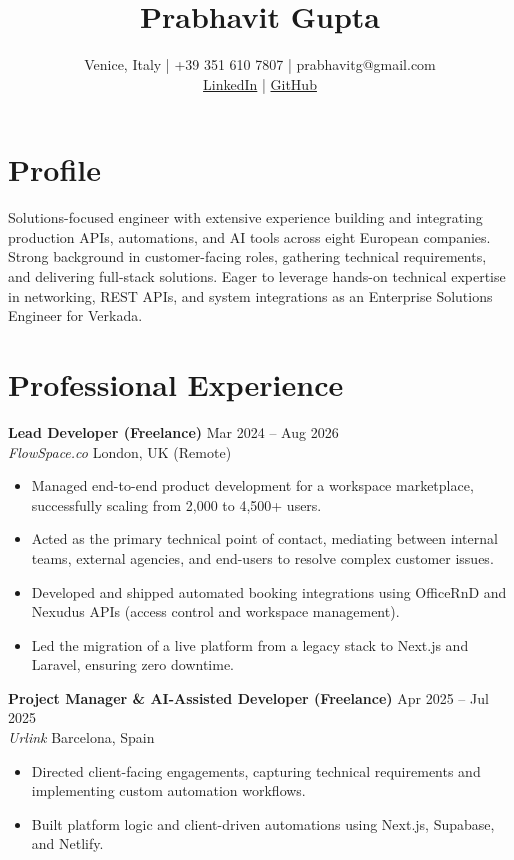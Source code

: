\documentclass[11pt,a4paper]{article}
\title{\vspace{-2cm}\textbf{Prabhavit Gupta}}
\author{Venice, Italy | +39 351 610 7807 | prabhavitg@gmail.com \\ \href{https://www.linkedin.com/in/prabhavit/}{LinkedIn} | \href{https://github.com/prab-gupta}{GitHub}}
\date{}
\begin{document}
\maketitle
\vspace{-1.5cm}

\section*{Profile}
Solutions-focused engineer with extensive experience building and integrating production APIs, automations, and AI tools across eight European companies. Strong background in customer-facing roles, gathering technical requirements, and delivering full-stack solutions. Eager to leverage hands-on technical expertise in networking, REST APIs, and system integrations as an Enterprise Solutions Engineer for Verkada. 

\section*{Professional Experience}
\noindent\textbf{Lead Developer (Freelance)} \hfill Mar 2024 -- Aug 2026 \\
\textit{FlowSpace.co} \hfill London, UK (Remote)
\begin{itemize}[noitemsep,topsep=0pt]
    \item Managed end-to-end product development for a workspace marketplace, successfully scaling from 2,000 to 4,500+ users.
    \item Acted as the primary technical point of contact, mediating between internal teams, external agencies, and end-users to resolve complex customer issues.
    \item Developed and shipped automated booking integrations using OfficeRnD and Nexudus APIs (access control and workspace management).
    \item Led the migration of a live platform from a legacy stack to Next.js and Laravel, ensuring zero downtime.
\end{itemize}

\vspace{0.2cm}
\noindent\textbf{Project Manager \& AI-Assisted Developer (Freelance)} \hfill Apr 2025 -- Jul 2025 \\
\textit{Urlink} \hfill Barcelona, Spain
\begin{itemize}[noitemsep,topsep=0pt]
    \item Directed client-facing engagements, capturing technical requirements and implementing custom automation workflows.
    \item Built platform logic and client-driven automations using Next.js, Supabase, and Netlify.
\end{itemize}
\end{document}
